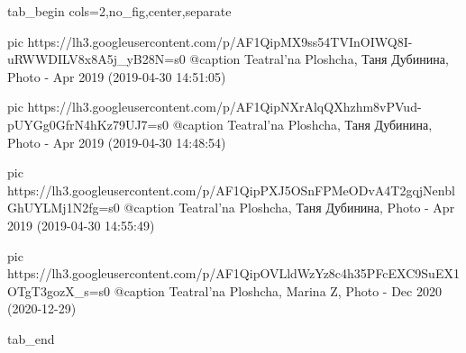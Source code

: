  
 
 
 
 

\ifcmt
  tab_begin cols=2,no_fig,center,separate

     pic https://lh3.googleusercontent.com/p/AF1QipMX9ss54TVInOIWQ8I-uRWWDILV8x8A5j_yB28N=s0
		 @caption Teatral'na Ploshcha, Таня Дубинина, Photo - Apr 2019 (2019-04-30 14:51:05)

		 pic https://lh3.googleusercontent.com/p/AF1QipNXrAlqQXhzhm8vPVud-pUYGg0GfrN4hKz79UJ7=s0
		 @caption Teatral'na Ploshcha, Таня Дубинина, Photo - Apr 2019 (2019-04-30 14:48:54)

		 pic https://lh3.googleusercontent.com/p/AF1QipPXJ5OSnFPMeODvA4T2gqjNenblGhUYLMj1N2fg=s0
		 @caption Teatral'na Ploshcha, Таня Дубинина, Photo - Apr 2019 (2019-04-30 14:55:49)
		 
		 pic https://lh3.googleusercontent.com/p/AF1QipOVLldWzYz8c4h35PFcEXC9SuEX1OTgT3gozX_s=s0
		 @caption Teatral'na Ploshcha, Marina Z, Photo - Dec 2020 (2020-12-29)

  tab_end
\fi
